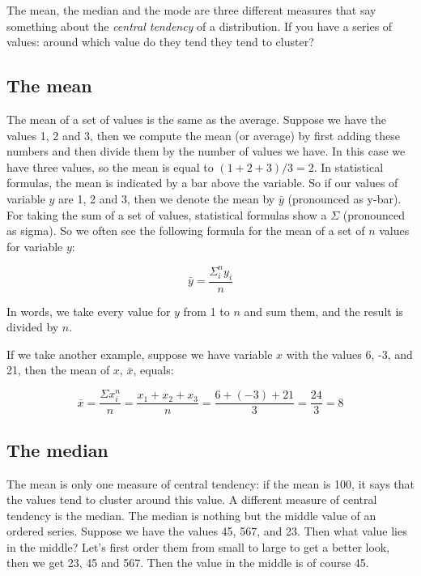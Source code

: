 The mean, the median and the mode are three different measures that say something about the \textit{central tendency} of a distribution. If you have a series of values: around which value do they tend they tend to cluster?

\subsection{The mean}
The mean of a set of values is the same as the average. Suppose we have the values 1, 2 and 3, then we compute the mean (or average) by first adding these numbers and then divide them by the number of values we have. In this case we have three values, so the mean is equal to $(1 + 2 + 3)/3 = 2$. In statistical formulas, the mean is indicated by a bar above the variable. So if our values of variable $y$ are 1, 2 and 3, then we denote the mean by $\bar{y}$ (pronounced as y-bar). For taking the sum of a set of values, statistical formulas show a $\Sigma$ (pronounced as sigma). So we often see the following formula for the mean of a set of $n$ values for variable $y$:

\begin{equation}
\bar{y} = \frac{\Sigma_i^n y_i}{n}
\end{equation}

In words, we take every value for $y$ from 1 to $n$ and sum them, and the result is divided by $n$.

If we take another example, suppose we have variable $x$ with the values {6, -3, and 21}, then the mean of $x$, $\bar{x}$, equals:

\begin{equation}
\bar{x} = \frac {  \Sigma x_i^n} {n} =    \frac{x_1 + x_2 + x_3}{n} = \frac{6 + (-3) + 21}{3} = \frac{24}{3} = 8
\end{equation}







\subsection{The median}
The mean is only one measure of central tendency: if the mean is 100, it says that the values tend to cluster around this value. A different measure of central tendency is the median. The median is nothing but the middle value of an ordered series. Suppose we have the values 45, 567, and 23. Then what value lies in the middle? Let's first order them from small to large to get a better look, then we get 23, 45 and 567. Then the value in the middle is of course 45.

